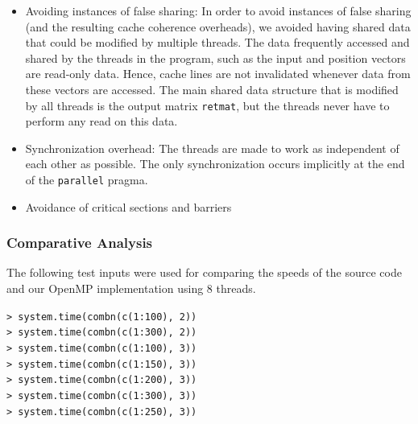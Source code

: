 \begin{itemize}
\item Avoiding instances of false sharing: In order to avoid instances of false sharing (and the resulting cache coherence overheads), we avoided having shared data that could be modified by multiple threads. The data frequently accessed and shared by the threads in the program, such as the input and position vectors are read-only data. Hence, cache lines are not invalidated whenever data from these vectors are accessed. The main shared data structure that is modified by all threads is the output matrix \texttt{retmat}, but the threads never have to perform any read on this data.

\item Synchronization overhead: The threads are made to work as independent of each other as possible. The only synchronization occurs implicitly at the end of the \texttt{parallel} pragma.

\item Avoidance of critical sections and barriers

\end{itemize}



\subsubsection{Comparative Analysis}
The following test inputs were used for comparing the speeds of the source code and our OpenMP implementation using 8 threads.\\
\null

\texttt{> system.time(combn(c(1:100), 2))}\\
\texttt{> system.time(combn(c(1:300), 2))}\\
\texttt{> system.time(combn(c(1:100), 3))}\\
\texttt{> system.time(combn(c(1:150), 3))}\\
\texttt{> system.time(combn(c(1:200), 3))}\\
\texttt{> system.time(combn(c(1:300), 3))}\\
\texttt{> system.time(combn(c(1:250), 3))}\\
\null

